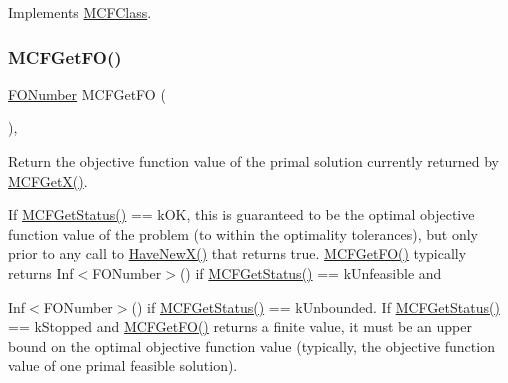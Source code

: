 Implements \mbox{\hyperlink{class_m_c_f_class_a1b0d5b8f2dfd729783e7c0fd604dc896}{M\+C\+F\+Class}}.

\mbox{\label{class_m_c_f_cplex_a854a2b3ad7bb3cca0326c8f581a2d673}} 
\subsubsection{\texorpdfstring{M\+C\+F\+Get\+F\+O()}{MCFGetFO()}}
{\footnotesize\ttfamily \mbox{\hyperlink{class_m_c_f_class_af5ee7b3099b0bc780a6a4b43629488fa}{F\+O\+Number}} M\+C\+F\+Get\+FO (\begin{DoxyParamCaption}\item[{void}]{ }\end{DoxyParamCaption})\hspace{0.3cm}{\ttfamily [override]}, {\ttfamily [virtual]}}

Return the objective function value of the primal solution currently returned by \mbox{\hyperlink{class_m_c_f_class_a4eb307e0707adaef99bb0e08c9e10eb8}{M\+C\+F\+Get\+X()}}.

If \mbox{\hyperlink{class_m_c_f_class_a333e27ad7a73779b096cb70829cbe8be}{M\+C\+F\+Get\+Status()}} == k\+OK, this is guaranteed to be the optimal objective function value of the problem (to within the optimality tolerances), but only prior to any call to \mbox{\hyperlink{class_m_c_f_class_a7a4966a98c7ffa909057064beb4507a5}{Have\+New\+X()}} that returns true. \mbox{\hyperlink{class_m_c_f_cplex_a854a2b3ad7bb3cca0326c8f581a2d673}{M\+C\+F\+Get\+F\+O()}} typically returns Inf$<$\+F\+O\+Number$>$() if \mbox{\hyperlink{class_m_c_f_class_a333e27ad7a73779b096cb70829cbe8be}{M\+C\+F\+Get\+Status()}} == k\+Unfeasible and
\begin{DoxyItemize}
\item Inf$<$\+F\+O\+Number$>$() if \mbox{\hyperlink{class_m_c_f_class_a333e27ad7a73779b096cb70829cbe8be}{M\+C\+F\+Get\+Status()}} == k\+Unbounded. If \mbox{\hyperlink{class_m_c_f_class_a333e27ad7a73779b096cb70829cbe8be}{M\+C\+F\+Get\+Status()}} == k\+Stopped and \mbox{\hyperlink{class_m_c_f_cplex_a854a2b3ad7bb3cca0326c8f581a2d673}{M\+C\+F\+Get\+F\+O()}} returns a finite value, it must be an upper bound on the optimal objective function value (typically, the objective function value of one primal feasible solution). 
\end{DoxyItemize}

